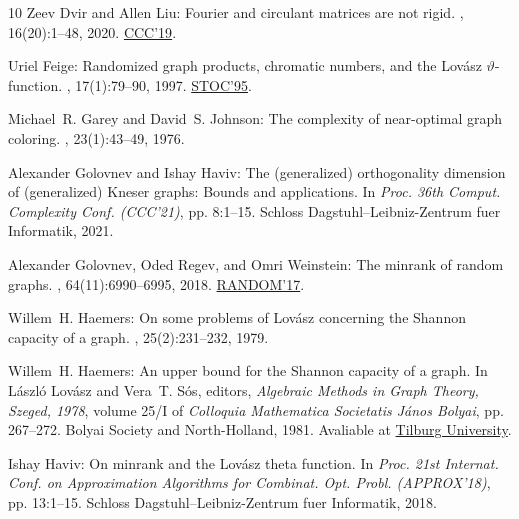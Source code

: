 \documentclass[11pt]{article}
\numberwithin{equation}{section}
\theoremstyle{definition}
\theoremstyle{plain}
\begin{document}
\begin{thebibliography}{10}
{\sc Zeev Dvir and Allen Liu}: Fourier and circulant matrices are not rigid.
, 16(20):1--48, 2020.
\newblock \prelim \href{https:doi.org/10.4230/LIPIcs.CCC.2019.17}{CCC'19}.

{\sc Uriel Feige}: Randomized graph products, chromatic numbers, and the
  {L}ov{\'{a}}sz $\vartheta$-function.
, 17(1):79--90, 1997.
\newblock \prelim \href{https:doi.org/10.1145/225058.225281}{STOC'95}.
\newblock [\epfmtdoi{10.1007/BF01196133}]

{\sc Michael~R. Garey and David~S. Johnson}: The complexity of near-optimal
  graph coloring.
, 23(1):43--49, 1976.
\newblock [\epfmtdoi{10.1145/321921.321926}]

{\sc Alexander Golovnev and Ishay Haviv}: The (generalized) orthogonality
  dimension of (generalized) {K}neser graphs: Bounds and applications.
\newblock In {\em Proc. 36th Comput. Complexity Conf. (CCC'21)}, pp. 8:1--15.
  Schloss Dagstuhl--Leibniz-Zentrum fuer Informatik, 2021.

{\sc Alexander Golovnev, Oded Regev, and Omri Weinstein}: The minrank of random
  graphs.
, 64(11):6990--6995, 2018.
\newblock \prelim
  \href{https:doi.org/10.4230/LIPIcs.APPROX-RANDOM.2017.46}{RANDOM'17}.

{\sc Willem~H. Haemers}: On some problems of {L}ov\'asz concerning the
  {S}hannon capacity of a graph.
, 25(2):231--232, 1979.

{\sc Willem~H. Haemers}: An upper bound for the {S}hannon capacity of a graph.
\newblock In {\sc L\'aszl\'o Lov\'asz and Vera~T. S\'os}, editors, {\em
  Algebraic Methods in Graph Theory, Szeged, 1978}, volume 25/I of {\em
  Colloquia Mathematica Societatis J\'anos Bolyai}, pp. 267--272. Bolyai
  Society and North-Holland, 1981.
\newblock Avaliable at
  \href{https://pure.uvt.nl/ws/portalfiles/portal/997000/UPPER\_\_\_.PDF}{Tilburg
  University}.

{\sc Ishay Haviv}: On minrank and the {L}ov{\'{a}}sz theta function.
\newblock In {\em Proc. 21st Internat. Conf. on Approximation Algorithms for
  Combinat. Opt. Probl. (APPROX'18)}, pp. 13:1--15. Schloss
  Dagstuhl--Leibniz-Zentrum fuer Informatik, 2018.


\end{thebibliography}
\end{document}
